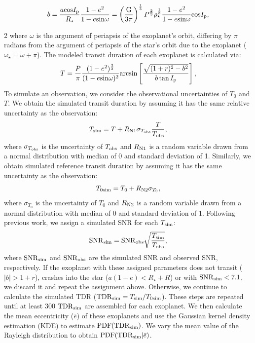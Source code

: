\documentclass[10pt]{article}
\begin{document}
\begin{equation}
\label{es3}
b = \frac{a {\rm cos}I_{\rm p}}{R_\star}  \frac{1-e^2}{1-e {\rm sin}\omega} = \left(\frac{{\rm G}}{3\pi}\right)^{\frac{1}{3}} P^{\frac{2}{3}} \rho_\star^{\frac{1}{3}} \frac{1-e^2}{1-e {\rm sin}\omega} {\rm cos}I_{\rm p},
\end{equation}

\begin{multicols}{2}
\noindent where $\omega$ is the argument of periapsis of the exoplanet's orbit, differing by $\pi$ radians from the argument of periapsis of the star's orbit due to the exoplanet ($\omega_\star = \omega+\pi$).
The modeled transit duration of each exoplanet is calculated via:
\begin{equation}
\label{es4}
T = \frac{P}{\pi} \frac{(1 - e^2)^\frac{3}{2}}{(1 - e {\rm sin} \omega)^2} {\rm arcsin} \left[ \frac{\sqrt{(1 + r)^2 - b^2}}{b \tan I_{\rm p}} \right],
\end{equation}
To simulate an observation, we consider the observational uncertainties of $T_0$ and $T$.
We obtain the simulated transit duration by assuming it has the same relative uncertainty as the observation:
\begin{equation}
\label{es5}
T_{\rm sim} = T + R_{\rm N1} \sigma_{T_{\rm obs}} \frac{T}{T_{\rm obs}},
\end{equation}
where $\sigma_{T_{\rm obs}}$ is the uncertainty of $T_{\rm obs}$ and $R_{\rm N1}$ is a random variable drawn from a normal distribution with median of 0 and standard deviation of 1.
Similarly, we obtain simulated reference transit duration by assuming it has the same uncertainty as the observation:
\begin{equation}
\label{es6}
T_{0\rm sim} = T_0 + R_{\rm N2} \sigma_{T_0},
\end{equation}
where $\sigma_{T_0}$ is the uncertainty of $T_0$ and $R_{\rm N2}$ is a random variable drawn from a normal distribution with median of 0 and standard deviation of 1.
Following previous work\cite{2014ApJ...790..146F}, we assign a simulated SNR for each $T_{\rm sim}$:
\begin{equation}
\label{es7}
{\rm SNR}_{\rm sim} = {\rm SNR}_{\rm obs} \sqrt{\frac{T_{\rm sim}}{T_{\rm obs}}},
\end{equation}
where ${\rm SNR}_{\rm sim}$ and ${\rm SNR}_{\rm obs}$ are the simulated SNR and observed SNR, respectively.
If the exoplanet with these assigned parameters does not transit ($|b|>1+r$), crashes into the star ($a(1-e)<R_{\star}+R$) or with ${\rm SNR}_{\rm sim}<7.1$, we discard it and repeat the assignment above.
Otherwise, we continue to calculate the simulated TDR (${\rm TDR}_{\rm sim}=T_{\rm sim}/T_{0\rm sim}$).
These steps are repeated until at least 300 ${\rm TDR}_{\rm sim}$ are assembled for each exoplanet.
We then calculate the mean eccentricity ($\bar{e}$) of these exoplanets and use the Gaussian kernel density estimation (KDE) to estimate ${\rm PDF}({\rm TDR}_{\rm sim})$.
We vary the mean value of the Rayleigh distribution to obtain ${\rm PDF}({\rm TDR}_{\rm sim} | \bar{e})$.


\end{multicols}
\end{document}
